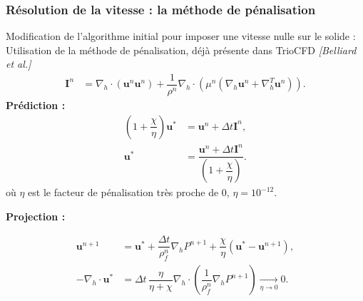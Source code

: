 \documentclass{beamer}
\newcommand{\vect}[1]{\bm{#1}}
\newcommand{\npl}{{n+1}}
\newcommand{\bib}[1]{{\color{cea_texte!80}\tiny\textit{[#1]}}}
\renewcommand{\frac}{\dfrac}
\begin{document}
\begin{frame}
    \frametitle{Résolution de la vitesse : la méthode de pénalisation}
    \footnotesize
     \footnotesize
        \begin{ceablock}{Modification de l'algorithme initial pour imposer une vitesse nulle sur le solide :}
	Utilisation de la méthode de pénalisation, déjà présente dans TrioCFD \bib{Belliard et al.}
\begin{align}
	\vect{I}^n &= \nabla_h \cdot (\vect{u}^n \vect{u}^n) + \frac{1}{\rho^n} \nabla_h \cdot(\mu^n(\nabla_h \vect{u}^n+\nabla_h^T \vect{u}^n)).
\end{align}
	\textbf{Prédiction :}
\begin{align}
	(1+\frac{\chi}{\eta} ) \vect{u}^* &= \vect{u}^n + \Delta t \vect{I}^n, \label{eq:PDFpred1} \\ 
	\vect{u}^* &= \frac{\vect{u}^n + \Delta t \vect{I}^n}{(1+\frac{\chi}{\eta} )}. \label{eq:PDFpred2}
\end{align}
	où $\eta$ est le facteur de pénalisation très proche de $0$, $\eta=10^{-12}$.
	

	\textbf{Projection :}

\begin{align}
	\vect{u}^{n+1} &= \vect{u}^* + \frac{\Delta t}{\rho^n_f} \nabla_h P^{n+1} +\frac{\chi}{\eta}(\vect{u}^*-\vect{u}^\npl),\\
-\nabla_h \cdot \vect{u}^* &= \Delta t \, \frac{\eta}{\eta + \chi} \nabla_h \cdot \left( \frac{1}{\rho^n_f} \nabla_h P^\npl \right) \underset{\eta \to 0}{\longrightarrow} 0.
%
\end{align}
	\end{ceablock}

\end{frame}
\end{document}
